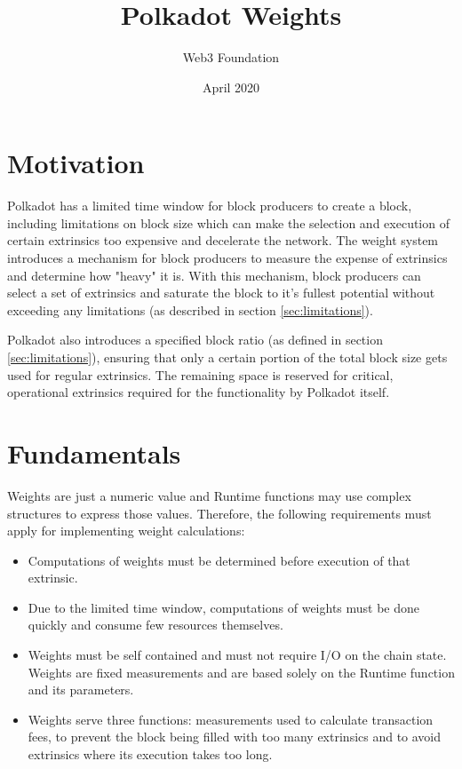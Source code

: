 \documentclass[11pt,a4paper]{article}
\begin{document}
\title{Polkadot Weights}
\author{Web3 Foundation}
\date{April 2020}
\maketitle

\section{Motivation}
Polkadot has a limited time window for block producers to create a block,
including limitations on block size which can make the selection and execution
of certain extrinsics too expensive and decelerate the network. The weight
system introduces a mechanism for block producers to measure the expense of
extrinsics and determine how "heavy" it is. With this mechanism, block producers
can select a set of extrinsics and saturate the block to it's fullest potential
without exceeding any limitations (as described in section \ref{sec:limitations}).
\newline

Polkadot also introduces a specified block ratio (as defined in section \ref{sec:limitations}),
ensuring that only a certain portion of the total block size gets used for regular extrinsics.
The remaining space is reserved for critical, operational extrinsics required for the functionality
by Polkadot itself.

\section{Fundamentals}
Weights are just a numeric value and Runtime functions may use complex structures to express those
values. Therefore, the following requirements must apply for implementing weight calculations:
\begin{itemize}
\item Computations of weights must be determined before execution of that extrinsic.
\item Due to the limited time window, computations of weights must be done quickly and consume
      few resources themselves.
\item Weights must be self contained and must not require I/O on the chain state. Weights are
      fixed measurements and are based solely on the Runtime function and its parameters.
\item Weights serve three functions: measurements used to calculate transaction fees, to prevent
      the block being filled with too many extrinsics and to avoid extrinsics where its execution
      takes too long.
\end{itemize}
\end{document}
